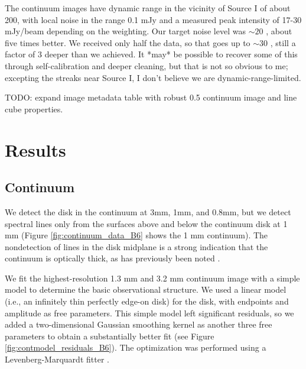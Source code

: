 \documentclass[twocolumn]{aastex61}
\begin{document}


The continuum images have dynamic range in the vicinity of Source I of about 200,
with local noise in the range 0.1 mJy \perbeam and a measured peak intensity of 17-30
mJy/beam depending on the weighting.
{\color{red} Our target noise level was $\sim20$ \microJy \perbeam,
about five times better.  We received only half the data, so that goes up to $\sim30$
\microJy \perbeam, still a factor of 3 deeper than we achieved.  It *may* be possible
to recover some of this through self-calibration and deeper cleaning, but that
is not so obvious to me; excepting the streaks near Source I, I don't believe
we are dynamic-range-limited.}


{\color{magenta} TODO: expand image metadata table with robust 0.5 continuum image
and line cube properties.}


\section{Results}

\subsection{Continuum}
We detect the disk in the continuum at 3mm, 1mm, and 0.8mm, but we detect
spectral lines only from the surfaces above and below the continuum disk at 1
mm (Figure \ref{fig:continuum_data_B6} shows the 1 mm continuum).  The nondetection of
lines in the disk midplane is a strong indication that the continuum is
optically thick, as has previously been noted
\citep[e.g.][]{Plambeck2016a}.


We fit the highest-resolution 1.3 mm and 3.2 mm continuum image with a simple
model to determine the basic
observational structure.  We used a linear model (i.e., an infinitely thin
perfectly edge-on disk) for the disk, with endpoints and amplitude as free parameters.
This simple model left significant residuals, so we added a two-dimensional
Gaussian smoothing kernel as another three free parameters to obtain a
substantially better fit (see Figure \ref{fig:contmodel_residuals_B6}).
The optimization was performed using a Levenberg-Marquardt
fitter \citep{Newville2014a}. %
\end{document}
